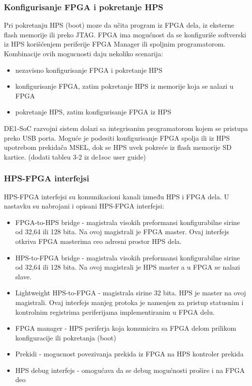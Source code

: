 \subsubsection{Konfigurisanje FPGA i pokretanje HPS}
Pri pokretanju HPS (boot) moze da učita program iz FPGA dela, iz eksterne flash memorije ili preko JTAG. FPGA ima mogućnost da se konfiguriše softverski iz HPS korišćenjem periferije FPGA Manager ili spoljnim programatorom. Kombinacije ovih mogucnosti daju nekoliko scenarija:
\begin{itemize}
\item nezavisno konfigurisanje FPGA i pokretanje HPS
\item konfigurisanje FPGA, zatim pokretanje HPS iz memorije koja se nalazi u FPGA
\item pokretanje HPS, zatim konfigurisanje FPGA iz HPS
\end{itemize}
DE1-SoC razvojni sistem dolazi sa integrisanim programatorom kojem se pristupa preko USB porta. Moguće je podesiti konfigurisanje FPGA spolja ili iz HPS upotrebom prekidača MSEL, dok se HPS uvek pokreće iz flash memorije SD kartice.
(dodati tableu 3-2 iz de1soc user guide)

\subsubsection{HPS-FPGA interfejsi}
HPS-FPGA interfejsi su komunikacioni kanali između HPS i FPGA dela. U nastavku su nabrojani i opisani HPS-FPGA interfejsi:
\begin{itemize}
\item  FPGA-to-HPS bridge - magistrala visokih preformansi konfigurabilne sirine od 32,64 ili 128 bita. Na ovoj magistrali je FPGA master. Ovaj interfejs otkriva FPGA masterima ceo adresni prostor HPS dela.
\item HPS-to-FPGA bridge - magistrala visokih preformansi konfigurabilne sirine od 32,64 ili 128 bita. Na ovoj magistrali je HPS master a u FPGA se nalazi slave.
\item Lightweight HPS-to-FPGA - magistrala sirine 32 bita. HPS je master na ovoj magistrali. Ovaj interfejs manjeg protoka je namenjen za pristup statusnim i kontrolnim registrima periferijama implementiranim u FPGA delu.
\item FPGA manager - HPS periferja koja komunicira sa FPGA delom prilikom konfiguracije ili pokretanja (boot)
\item Prekidi - mogucnost povezivanja prekida iz FPGA na HPS kontroler prekida
\item HPS debug interfejs - omogućava da se debug mogućnosti prošire i na FPGA deo
\end{itemize}

